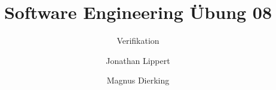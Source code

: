 \documentclass[
	ngerman,
	twoside,
	pdfa=false,
	ruledheaders=section,%
	class=report,%
	thesis={type=Übung},%
	accentcolor=TUDa-9d,%
	custommargins=false,%
	marginpar=false,%
	parskip=half-,%
	fontsize=11pt,%
]{tudapub}
\begin{document}
	\title{Software Engineering Übung 08}
	\subtitle{Verifikation}
	\author[J. Lippert \and M. Dierking]
	{Jonathan Lippert \and Magnus Dierking}

	
	\submissiondate{\today}
	

	\maketitle


%	

	\newpage
	\setcounter{page}{1}
	

     
     

	

	\printbibliography %
	
%	
	
\end{document}
